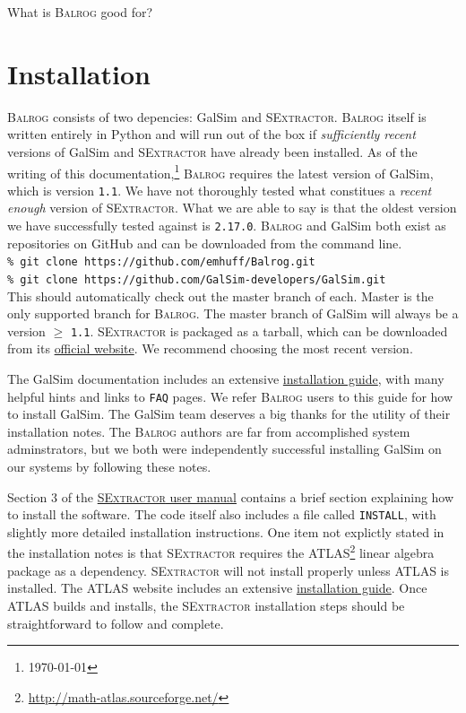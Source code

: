 \documentclass[12pt]{book}
\newcommand{\py}{Python}
\newcommand{\galsim}{GalSim}
\newcommand{\balrog}{\textsc{Balrog}}
\newcommand{\sex}{\textsc{SExtractor}}
\newcommand{\inline}{\\[0.4cm]}
\newcommand{\ericdate}{\mydate\today}
\begin{document}
What is \balrog{} good for?


\chapter{Installation}
\label{sec:install}

\balrog{} consists of two depencies: \galsim{} and \sex{}.
\balrog{} itself is written entirely in \py{} and will run out of the box if  
\emph{sufficiently recent} versions of \galsim{} and \sex{} have already been installed.
As of the writing of this documentation,\footnote{\label{foot:date}\ericdate} 
\balrog{} requires the latest version of \galsim{}, which is version \texttt{1.1}.
We have not thoroughly tested what constitues a \emph{recent enough} version of \sex{}.
What we are able to say is that the oldest version we have successfully tested against is \texttt{2.17.0}.
\balrog{} and \galsim{} both exist as repositories on GitHub and can be downloaded 
from the command line.
\inline
\texttt{\% git clone https://github.com/emhuff/Balrog.git} \\
\texttt{\% git clone https://github.com/GalSim-developers/GalSim.git}
\inline
This should automatically check out the master branch of each.
Master is the only supported branch for \balrog{}. 
The master branch of \galsim{} will always be a version $\geq$ \texttt{1.1}.
\sex{} is packaged as a tarball, which can be downloaded 
from its \href{https://www.astromatic.net/software/sextractor}{official website}.
We recommend choosing the most recent version.

The \galsim{} documentation includes an extensive
\href{https://github.com/GalSim-developers/GalSim/blob/releases/1.0/INSTALL.md}{installation guide},
with many helpful hints and links to \texttt{FAQ} pages. 
We refer \balrog{} users to this guide for how to install \galsim{}.
The \galsim{} team deserves a big thanks for the utility of their installation notes.
The \balrog{} authors are far from accomplished system adminstrators, 
but we both were independently successful installing \galsim{} on our systems by following these notes.

Section 3 of the \href{https://www.astromatic.net/pubsvn/software/sextractor/trunk/doc/sextractor.pdf}{\sex{} user manual}
contains a brief section explaining how to install the software. The code itself also includes a file called \texttt{INSTALL}, with
slightly more detailed installation instructions.
One item not explictly stated in the installation notes is that \sex{} requires the ATLAS\footnote{\url{http://math-atlas.sourceforge.net/}}
linear algebra package as a dependency.
\sex{} will not install properly unless ATLAS is installed. 
The ATLAS website includes an extensive \href{http://math-atlas.sourceforge.net/atlas_install/}{installation guide}.
Once ATLAS builds and installs, the \sex{} installation steps should be straightforward to follow and complete.
\end{document}

